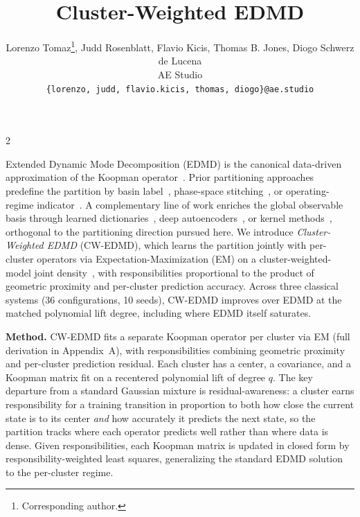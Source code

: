 \documentclass{article}
\title{Cluster-Weighted EDMD}
\date{}
\author{%
	Lorenzo Tomaz\thanks{Corresponding author.}, Judd Rosenblatt, Flavio Kicis, Thomas B. Jones, Diogo Schwerz de Lucena \\
	AE Studio \\
	\texttt{\{lorenzo, judd, flavio.kicis, thomas, diogo\}@ae.studio}
}
\begin{document}
\maketitle


\begin{multicols}{2}

Extended Dynamic Mode Decomposition (EDMD) is the canonical data-driven approximation of the Koopman operator~\citep{williams2015edmd,mezic2005spectral,brunton2022modern,korda2018mpc,mauroy2020koopman}. Prior partitioning approaches predefine the partition by basin label~\citep{williams2015edmd}, phase-space stitching~\citep{sinha2020phase}, or operating-regime indicator~\citep{peitz2019switched}. A complementary line of work enriches the global observable basis through learned dictionaries~\citep{li2017dictionary}, deep autoencoders~\citep{lusch2018deep}, or kernel methods~\citep{williams2015kernel}, orthogonal to the partitioning direction pursued here. We introduce \emph{Cluster-Weighted EDMD} (CW-EDMD), which learns the partition jointly with per-cluster operators via Expectation-Maximization (EM) on a cluster-weighted-model joint density~\citep{gershenfeld1999nature,ingrassia2014linear,punzo2014polynomial}, with responsibilities proportional to the product of geometric proximity and per-cluster prediction accuracy. Across three classical systems (36 configurations, 10 seeds), CW-EDMD improves over EDMD at the matched polynomial lift degree, including where EDMD itself saturates.

\noindent\textbf{Method.} CW-EDMD fits a separate Koopman operator per cluster via EM (full derivation in Appendix~A), with responsibilities combining geometric proximity and per-cluster prediction residual. Each cluster has a center, a covariance, and a Koopman matrix fit on a recentered polynomial lift of degree $q$. The key departure from a standard Gaussian mixture is residual-awareness: a cluster earns responsibility for a training transition in proportion to both how close the current state is to its center \emph{and} how accurately it predicts the next state, so the partition tracks where each operator predicts well rather than where data is dense. Given responsibilities, each Koopman matrix is updated in closed form by responsibility-weighted least squares, generalizing the standard EDMD solution to the per-cluster regime.


\end{multicols}
\end{document}
